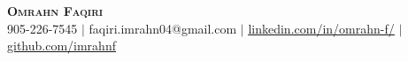 \begin{center}
    \textbf{\Huge \scshape Omrahn Faqiri} \\ \vspace{1pt}
    \small 905-226-7545 $|$ {faqiri.imrahn04@gmail.com} $|$ 
    \href{https://www.linkedin.com/in/omrahn-f/}{\underline{linkedin.com/in/omrahn-f/}} $|$ 
    \href{https://github.com/imrahnf}{\underline{github.com/imrahnf}} 
\end{center}
